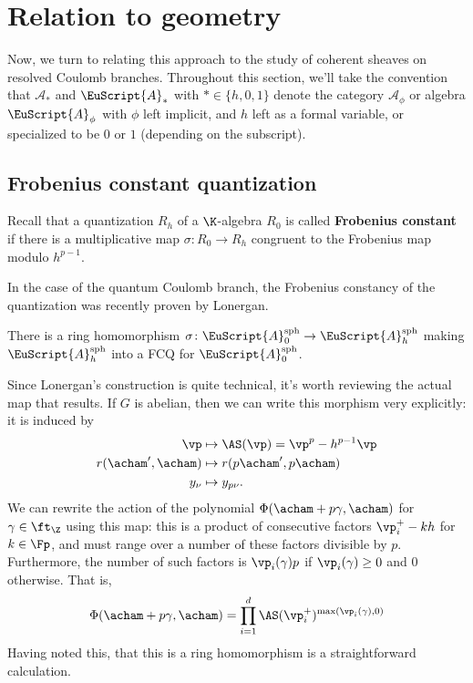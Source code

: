 \section{Relation to geometry}
Now, we turn to relating this approach to the study of coherent
sheaves on resolved Coulomb branches.   Throughout this section, we'll
take the convention that $\mathscr{A}_*$
and $\EuScript{A}_*$ with $*\in \{h,0,1\}$ denote the category $\mathscr{A}_\phi$ or algebra
$\EuScript{A}_\phi$ with $\phi$ left implicit, and $h$ left as a formal variable, or specialized to
be $0$ or $1$ (depending on the subscript).  

\subsection{Frobenius constant quantization}

Recall that a quantization $R_h$ of a $\K$-algebra $R_0$ is called {\bf Frobenius
  constant} if there is a multiplicative map $\sigma\colon
R_0\to R_h$ congruent to the Frobenius map
modulo $h^{p-1}$.  

In the case of the quantum Coulomb branch, the Frobenius constancy of the quantization was recently proven by Lonergan.
\begin{theorem}
  There is a ring homomorphism $\sigma\colon \EuScript{A}_0^{\operatorname{sph}}\to  \EuScript{A}_h^{\operatorname{sph}}$
  making $\EuScript{A}_h^{\operatorname{sph}}$ into a FCQ for $\EuScript{A}_0^{\operatorname{sph}}$.
\end{theorem}
Since Lonergan's construction is quite technical, it's worth reviewing the actual map that results.    If $G$ is abelian, then we can write this morphism very explicitly:
  it is induced by 
\begin{align}
    \vp &\mapsto \AS(\vp)=\vp^p-h^{p-1}\vp\\
    r(\acham',\acham)&\mapsto r(p\acham',p\acham)\\
    y_{\nu}&\mapsto y_{p\nu}.
\end{align} 
We can rewrite the action of the polynomial
$\Phi(\acham+p\gamma,\acham)$ for $\gamma\in \ft_{\Z}$ using this map:
this is a product of consecutive factors $\vp_i^+-kh$ for $k\in \Fp$,
and must range over a number of these factors divisible by $p$.
Furthermore, the number of such factors is $\vp_i(\gamma)p$ if
$\vp_i(\gamma)\geq 0$ and $0$ otherwise.  That
is,
\[\Phi(\acham+p\gamma,\acham)=\prod_{i=1}^d
\AS(\vp^+_i)^{\operatorname{max}(\vp_i(\gamma),0)}\]
Having noted this, that this is a ring homomorphism is a
straightforward calculation.

